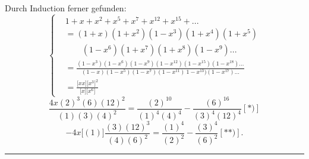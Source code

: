 \begingroup
\makeatletter\tagsleft@true\let\veqno\@@leqno\makeatother
\newcommand{\TransBracket}[1]{\boldsymbol{[}#1\boldsymbol{]}}
\par\indent Durch Induction ferner gefunden:
\begin{equation*}\tag*{[6]}
\left\{\begin{aligned}
&1+x+x^2+x^5+x^7+x^{12}+x^{15}+{.}{.}{.}\\
&=(1+x)(1+x^2)(1-x^3)(1+x^4)(1+x^5)\\
&\qquad(1-x^6)(1+x^7)(1+x^8)(1-x^9){.}{.}{.}\\
&=\frac{(1-x^3)(1-x^6)(1-x^9)(1-x^{12})(1-x^{15})(1-x^{18}){.}{.}{.}}
{(1-x)(1-x^5)(1-x^7)(1-x^{11})\ 1-x^{13})(1-x^{17}){.}{.}{.}}\\
&=\frac{\TransBracket{xx}\TransBracket{x^3}^2}{\TransBracket{x}\TransBracket{x^6}}
\end{aligned}\right.
\end{equation*}
\clearpage
{}
\[\frac{4x(2)^3(6)(12)^2}{(1)(3)(4)^2}
=\frac{(2)^{10}}{(1)^4(4)^4}-\frac{(6)^{16}}{(3)^4(12)^4}[\text{*)}]\]
\[-4x\bigl[(1)\bigr]\frac{(3)(12)^3}{(4)(6)^2}
=\frac{(1)^4}{(2)^2}-\frac{(3)^4}{(6)^2}[\text{**)}].\]
\par\smallskip\noindent\rule{.25\linewidth}{.4pt}\par
{\small
\par\indent [*) Hier ist $(n)=\TransBracket{x^n}$ gesetzt.]
\par{}
\par}
\clearpage
\endgroup
